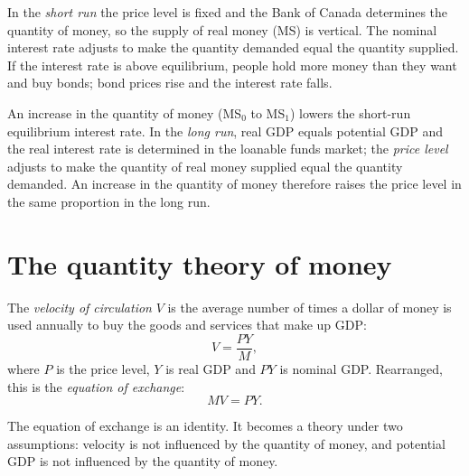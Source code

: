 In the \emph{short run} the price level is fixed and the Bank of Canada determines the
quantity of money, so the supply of real money (MS) is vertical. The nominal interest
rate adjusts to make the quantity demanded equal the quantity supplied. If the interest
rate is above equilibrium, people hold more money than they want and buy bonds; bond prices
rise and the interest rate falls.

\begin{center}
\end{center}

An increase in the quantity of money (MS$_0$ to MS$_1$) lowers the short-run equilibrium
interest rate. In the \emph{long run}, real GDP equals potential GDP and the real
interest rate is determined in the loanable funds market; the \emph{price level} adjusts
to make the quantity of real money supplied equal the quantity demanded. An increase in
the quantity of money therefore raises the price level in the same proportion in the long
run.

\section{The quantity theory of money}

\begin{definition}
The \emph{velocity of circulation} $V$ is the average number of times a dollar of money
is used annually to buy the goods and services that make up GDP:
\[
  V = \frac{PY}{M},
\]
where $P$ is the price level, $Y$ is real GDP and $PY$ is nominal GDP. Rearranged, this is
the \emph{equation of exchange}:
\[
  MV = PY.
\]
\end{definition}

The equation of exchange is an identity. It becomes a theory under two assumptions:
velocity is not influenced by the quantity of money, and potential GDP is not influenced
by the quantity of money.

